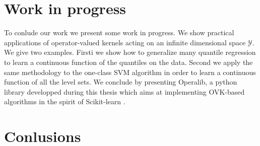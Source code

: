 
\chapter{Work in progress}
\label{ch:Perspectives}
\bigskip
\begin{justify}
    To conlude our work we present some work in progress. We show practical
    applications of operator-valued kernels acting on an infinite dimensional
    space $\mathcal{Y}$. We give two examples. Firsti we show how to generalize
    many quantile regression to learn a continuous function of the quantiles on
    the data. Second we apply the same methodology to the one-class SVM
    algorithm in order to learn a continuous function of all the level sets. We
    conclude by presenting Operalib, a python library developped during this
    thesis which aims at implementing \acs{OVK}-based algorithms in the spirit
    of Scikit-learn \citep{pedregosa2011scikit}.
\end{justify}
\minitoc




\chapter{Conlusions}
\label{ch:conclusion}

